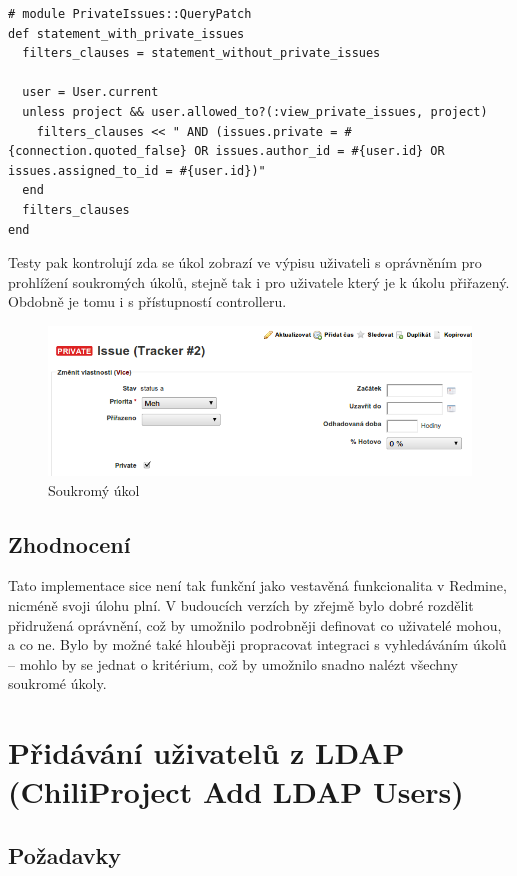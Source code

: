 \documentclass[thesis=B,czech]{FITthesis}[2012/05/02]
\begin{document}
\begin{lstlisting}
# module PrivateIssues::QueryPatch
def statement_with_private_issues
  filters_clauses = statement_without_private_issues

  user = User.current
  unless project && user.allowed_to?(:view_private_issues, project)
    filters_clauses << " AND (issues.private = #{connection.quoted_false} OR issues.author_id = #{user.id} OR issues.assigned_to_id = #{user.id})"
  end
  filters_clauses
end
\end{lstlisting}
Testy pak kontrolují zda se úkol zobrazí ve výpisu uživateli
s oprávněním pro prohlížení soukromých úkolů, stejně tak i pro uživatele
který je k úkolu přiřazený. Obdobně je tomu i s přístupností
controlleru.

\begin{figure}[tbp]
\centering
\centerline{\includegraphics[width=1.2\textwidth]{issues-gui1.png}}
\caption{Soukromý úkol}
\end{figure}

\subsection{Zhodnocení}

Tato implementace sice není tak funkční jako vestavěná funkcionalita
v Redmine, nicméně svoji úlohu plní. V budoucích verzích by zřejmě bylo
dobré rozdělit přidružená oprávnění, což by umožnilo podrobněji
definovat co uživatelé mohou, a co ne. Bylo by možné také hlouběji
propracovat integraci s vyhledáváním úkolů -- mohlo by se jednat
o kritérium, což by umožnilo snadno nalézt všechny soukromé úkoly.

\section[Přidávání uživatelů z LDAP]{Přidávání uživatelů z LDAP (ChiliProject Add LDAP Users)}
\label{sec:add_ldap_users}

\subsection{Požadavky}
\end{document}
